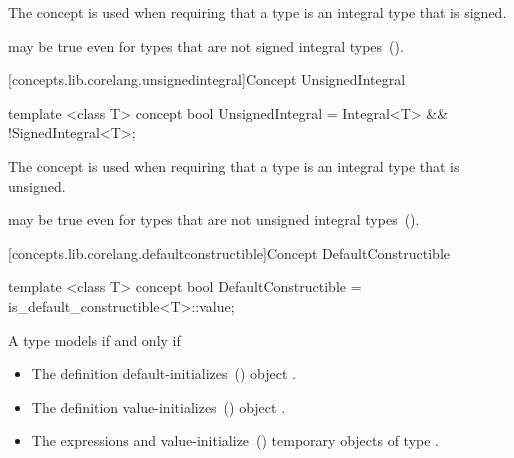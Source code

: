 \begin{addedblock}
\begin{itemdescr}
{\color{oldclr}
\pnum
The  concept is used when requiring that a type  is an
integral type that is signed.
}

\pnum
\enternote {} may be true even for types that are not signed
integral types~().
\exitnote
\end{itemdescr}

[concepts.lib.corelang.unsignedintegral]{Concept UnsignedIntegral}

%
\begin{itemdecl}
template <class T>
concept bool UnsignedIntegral =
  Integral<T> && !SignedIntegral<T>;
\end{itemdecl}

\begin{itemdescr}
{\color{oldclr}
\pnum
The  concept is used when requiring that a type  is an
integral type that is unsigned.
}

\pnum
\enternote {} may be true even for types that are not unsigned
integral types~().
\exitnote
\end{itemdescr}

[concepts.lib.corelang.defaultconstructible]{Concept DefaultConstructible}


%
\begin{itemdecl}
template <class T>
concept bool DefaultConstructible =
  is_default_constructible<T>::value;
\end{itemdecl}

\begin{itemdescr}
\pnum
A type  models  if and only if

\begin{itemize}
\item The definition  default-initializes~()
object .
\item The definition  value-initializes~()
object .
\item The expressions  and  value-initialize~()
temporary objects of type .
\end{itemize}


\end{itemdescr}
\end{addedblock}
